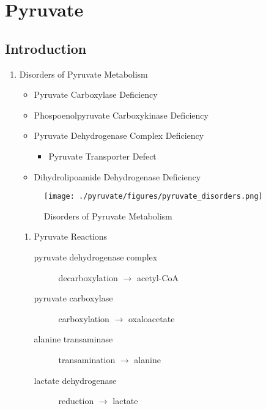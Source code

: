 \documentclass{scrartcl}
\begin{document}
\section{Pyruvate}
\label{sec:org2b9fa27}
\subsection{Introduction}
\label{sec:orgfb27f8a}
\begin{enumerate}
\item Disorders of Pyruvate Metabolism
\label{sec:orgc6808f3}

\begin{itemize}
\item Pyruvate Carboxylase Deficiency
\item Phospoenolpyruvate Carboxykinase Deficiency
\item Pyruvate Dehydrogenase Complex Deficiency
\begin{itemize}
\item Pyruvate Transporter Defect
\end{itemize}
\item Dihydrolipoamide Dehydrogenase Deficiency
\end{itemize}


\begin{figure}[htbp]
\centering
\texttt{[image: ./pyruvate/figures/pyruvate\_disorders.png]}
\caption[TCA]{\label{fig:org8bf4729}
Disorders of Pyruvate Metabolism}
\end{figure}

\begin{enumerate}
\item Pyruvate Reactions
\label{sec:orgaee0876}

\begin{description}
\item[{pyruvate dehydrogenase complex}] decarboxylation \(\to\) acetyl-CoA
\end{description}


\begin{description}
\item[{pyruvate carboxylase}] carboxylation \(\to\) oxaloacetate
\end{description}


\begin{description}
\item[{alanine transaminase}] transamination \(\to\) alanine
\end{description}


\begin{description}
\item[{lactate dehydrogenase}] reduction \(\to\) lactate
\end{description}

\end{enumerate}
\end{enumerate}
\end{document}
